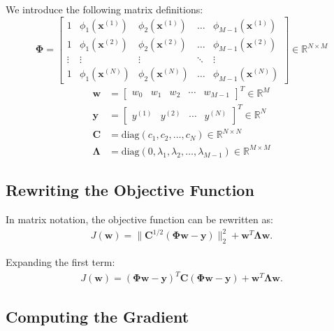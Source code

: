 \documentclass[12pt]{article}
\begin{document}
We introduce the following matrix definitions:
\[
    \mathbf{\Phi} =
    \begin{bmatrix}
        1 & \phi_1(\mathbf{x}^{(1)}) & \phi_2(\mathbf{x}^{(1)}) & \dots & \phi_{M-1}(\mathbf{x}^{(1)}) \\
        1 & \phi_1(\mathbf{x}^{(2)}) & \phi_2(\mathbf{x}^{(2)}) & \dots & \phi_{M-1}(\mathbf{x}^{(2)}) \\
        \vdots & \vdots & \vdots & \ddots & \vdots \\
        1 & \phi_1(\mathbf{x}^{(N)}) & \phi_2(\mathbf{x}^{(N)}) & \dots & \phi_{M-1}(\mathbf{x}^{(N)})
    \end{bmatrix} \in \mathbb{R}^{N \times M}
\]
\begin{align*}
    \mathbf{w} &=
    \begin{bmatrix}
        w_0 & w_1 & w_2 & \cdots & w_{M-1}
    \end{bmatrix}^T \in \mathbb{R}^{M}
\\
    \mathbf{y} &=
    \begin{bmatrix}
        y^{(1)} &
        y^{(2)} &
        \cdots &
        y^{(N)}
    \end{bmatrix}^T \in \mathbb{R}^{N}
\\
    \mathbf{C} &= \text{diag}(c_1, c_2, \dots, c_N) \in \mathbb{R}^{N \times N}
\\
    \mathbf{\Lambda} &= \text{diag}(0, \lambda_1, \lambda_2, \dots, \lambda_{M-1}) \in \mathbb{R}^{M \times M}
\end{align*}

\subsection{Rewriting the Objective Function}

In matrix notation, the objective function can be rewritten as:
\begin{align*}
    J(\mathbf{w}) = \|\mathbf{C}^{1/2} (\mathbf{\Phi} \mathbf{w} - \mathbf{y})\|_2^2 + \mathbf{w}^T \mathbf{\Lambda} \mathbf{w}.
\end{align*}

Expanding the first term:
\begin{align*}
    J(\mathbf{w}) = (\mathbf{\Phi} \mathbf{w} - \mathbf{y})^T \mathbf{C} (\mathbf{\Phi} \mathbf{w} - \mathbf{y}) + \mathbf{w}^T \mathbf{\Lambda} \mathbf{w}.
\end{align*}

\subsection{Computing the Gradient}
\end{document}
